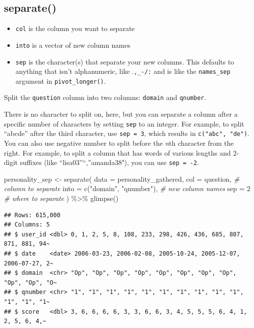 \documentclass[
  oneside]{book}
\newenvironment{Shaded}{\begin{snugshade}}{\end{snugshade}}
\newcommand{\AttributeTok}[1]{\textcolor[rgb]{0.77,0.63,0.00}{#1}}
\newcommand{\CommentTok}[1]{\textcolor[rgb]{0.56,0.35,0.01}{\textit{#1}}}
\newcommand{\DecValTok}[1]{\textcolor[rgb]{0.00,0.00,0.81}{#1}}
\newcommand{\FunctionTok}[1]{\textcolor[rgb]{0.00,0.00,0.00}{#1}}
\newcommand{\NormalTok}[1]{#1}
\newcommand{\OtherTok}[1]{\textcolor[rgb]{0.56,0.35,0.01}{#1}}
\newcommand{\SpecialCharTok}[1]{\textcolor[rgb]{0.00,0.00,0.00}{#1}}
\newcommand{\StringTok}[1]{\textcolor[rgb]{0.31,0.60,0.02}{#1}}
\providecommand{\tightlist}{%
  \setlength{\itemsep}{0pt}\setlength{\parskip}{0pt}}
\begin{document}
\hypertarget{separate}{%
\subsection{separate()}\label{separate}}

\begin{itemize}
\tightlist
\item
  \texttt{col} is the column you want to separate
\item
  \texttt{into} is a vector of new column names
\item
  \texttt{sep} is the character(s) that separate your new columns. This defaults to anything that isn't alphanumeric, like .\texttt{,\_-/:} and is like the \texttt{names\_sep} argument in \texttt{pivot\_longer()}.
\end{itemize}

Split the \texttt{question} column into two columns: \texttt{domain} and \texttt{qnumber}.

There is no character to split on, here, but you can separate a column after a specific number of characters by setting \texttt{sep} to an integer. For example, to split ``abcde'' after the third character, use \texttt{sep\ =\ 3}, which results in \texttt{c("abc",\ "de")}. You can also use negative number to split before the \emph{n}th character from the right. For example, to split a column that has words of various lengths and 2-digit suffixes (like ``lisa03''``,''amanda38"), you can use \texttt{sep\ =\ -2}.

\begin{Shaded}
\begin{Highlighting}[]
\NormalTok{personality\_sep }\OtherTok{\textless{}{-}} \FunctionTok{separate}\NormalTok{(}
  \AttributeTok{data =}\NormalTok{ personality\_gathered, }
  \AttributeTok{col =}\NormalTok{ question,                }\CommentTok{\# column to separate}
  \AttributeTok{into =} \FunctionTok{c}\NormalTok{(}\StringTok{"domain"}\NormalTok{, }\StringTok{"qnumber"}\NormalTok{), }\CommentTok{\# new column names}
  \AttributeTok{sep =} \DecValTok{2}                        \CommentTok{\# where to separate}
\NormalTok{) }\SpecialCharTok{\%\textgreater{}\%}
  \FunctionTok{glimpse}\NormalTok{()}
\end{Highlighting}
\end{Shaded}

\begin{verbatim}
## Rows: 615,000
## Columns: 5
## $ user_id <dbl> 0, 1, 2, 5, 8, 108, 233, 298, 426, 436, 685, 807, 871, 881, 94~
## $ date    <date> 2006-03-23, 2006-02-08, 2005-10-24, 2005-12-07, 2006-07-27, 2~
## $ domain  <chr> "Op", "Op", "Op", "Op", "Op", "Op", "Op", "Op", "Op", "Op", "O~
## $ qnumber <chr> "1", "1", "1", "1", "1", "1", "1", "1", "1", "1", "1", "1", "1~
## $ score   <dbl> 3, 6, 6, 6, 6, 3, 3, 6, 6, 3, 4, 5, 5, 5, 6, 4, 1, 2, 5, 6, 4,~
\end{verbatim}
\end{document}
